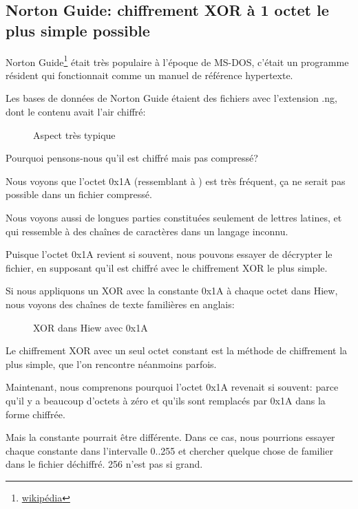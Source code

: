 \clearpage
\subsection{Norton Guide: chiffrement XOR à 1 octet le plus simple possible}
\label{norton_guide}

Norton Guide\footnote{\href{http://go.yurichev.com/17116}{wikipédia}} était très
populaire à l'époque de MS-DOS, c'était un programme résident qui fonctionnait comme
un manuel de référence hypertexte.

Les bases de données de Norton Guide étaient des fichiers avec l'extension .ng, dont
le contenu avait l'air chiffré:

\begin{figure}[H]
\centering
{}
\caption{Aspect très typique}
\end{figure}

Pourquoi pensons-nous qu'il est chiffré mais pas compressé?

Nous voyons que l'octet 0x1A (ressemblant à \q{$\rightarrow$}) est très fréquent,
ça ne serait pas possible dans un fichier compressé.

Nous voyons aussi de longues parties constituées seulement de lettres latines, et
qui ressemble à des chaînes de caractères dans un langage inconnu.

\clearpage
Puisque l'octet 0x1A revient si souvent, nous pouvons essayer de décrypter le fichier,
en supposant qu'il est chiffré avec le chiffrement XOR le plus simple.

Si nous appliquons un XOR avec la constante 0x1A à chaque octet dans Hiew, nous voyons
des chaînes de texte familières en anglais:

\begin{figure}[H]
\centering
{}
\caption{XOR dans Hiew avec 0x1A}
\end{figure}

Le chiffrement XOR avec un seul octet constant est la méthode de chiffrement la plus
simple, que l'on rencontre néanmoins parfois.

Maintenant, nous comprenons pourquoi l'octet 0x1A revenait si souvent: parce qu'il
y a beaucoup d'octets à zéro et qu'ils sont remplacés par 0x1A dans la forme chiffrée.

Mais la constante pourrait être différente.
Dans ce cas, nous pourrions essayer chaque constante dans l'intervalle 0..255 et
chercher quelque chose de familier dans le fichier déchiffré. 256 n'est pas si grand.

